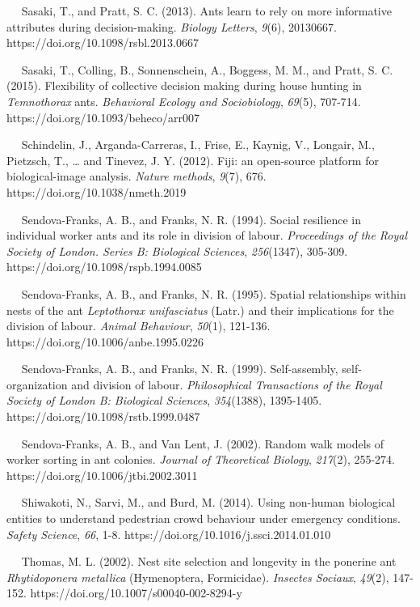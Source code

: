 \documentclass[3p]{elsarticle} %
\begin{document}
~~ Sasaki, T., and Pratt, S. C. (2013). Ants learn to rely on more
informative attributes during decision-making. \emph{Biology Letters},
\emph{9}(6), 20130667. https://doi.org/10.1098/rsbl.2013.0667

~~ Sasaki, T., Colling, B., Sonnenschein, A., Boggess, M. M., and Pratt,
S. C. (2015). Flexibility of collective decision making during house
hunting in \emph{Temnothorax} ants. \emph{Behavioral Ecology and
Sociobiology}, \emph{69}(5), 707-714.
https://doi.org/10.1093/beheco/arr007

~~ Schindelin, J., Arganda-Carreras, I., Frise, E., Kaynig, V., Longair,
M., Pietzsch, T., \ldots{} and Tinevez, J. Y. (2012). Fiji: an
open-source platform for biological-image analysis. \emph{Nature
methods}, \emph{9}(7), 676. https://doi.org/10.1038/nmeth.2019

~~ Sendova-Franks, A. B., and Franks, N. R. (1994). Social resilience in
individual worker ants and its role in division of labour.
\emph{Proceedings of the Royal Society of London. Series B: Biological
Sciences}, \emph{256}(1347), 305-309.
https://doi.org/10.1098/rspb.1994.0085

~~ Sendova-Franks, A. B., and Franks, N. R. (1995). Spatial
relationships within nests of the ant \emph{Leptothorax unifasciatus}
(Latr.) and their implications for the division of labour. \emph{Animal
Behaviour}, \emph{50}(1), 121-136.
https://doi.org/10.1006/anbe.1995.0226

~~ Sendova-Franks, A. B., and Franks, N. R. (1999). Self-assembly,
self-organization and division of labour. \emph{Philosophical
Transactions of the Royal Society of London B: Biological Sciences},
\emph{354}(1388), 1395-1405. https://doi.org/10.1098/rstb.1999.0487

~~ Sendova-Franks, A. B., and Van Lent, J. (2002). Random walk models of
worker sorting in ant colonies. \emph{Journal of Theoretical Biology},
\emph{217}(2), 255-274. https://doi.org/10.1006/jtbi.2002.3011

~~ Shiwakoti, N., Sarvi, M., and Burd, M. (2014). Using non-human
biological entities to understand pedestrian crowd behaviour under
emergency conditions. \emph{Safety Science}, \emph{66}, 1-8.
https://doi.org/10.1016/j.ssci.2014.01.010

~~ Thomas, M. L. (2002). Nest site selection and longevity in the
ponerine ant \emph{Rhytidoponera metallica} (Hymenoptera, Formicidae).
\emph{Insectes Sociaux}, \emph{49}(2), 147-152.
https://doi.org/10.1007/s00040-002-8294-y
\end{document}
